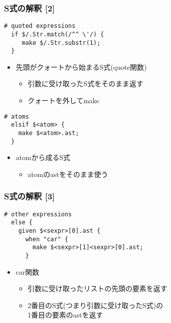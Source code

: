 \documentclass[14pt,dvipdfm,trans]{beamer}
\begin{document}
\begin{frame}[fragile]
 \frametitle{S式の解釈 [2]}
 \begin{lstlisting}[firstnumber=2]
  # quoted expressions
  if $/.Str.match(/^^ \'/) {
     make $/.Str.substr(1);
  } 
 \end{lstlisting}
\begin{itemize}
 \item <2-> 先頭がクォートから始まるS式(quote関数)
       \begin{itemize}
	\item <3-> 引数に受け取ったS式をそのまま返す 
	\item <4-> クォートを外してmake
       \end{itemize}
\end{itemize}
 \pause[5]
 \begin{lstlisting}[firstnumber=6]
   # atoms
  elsif $<atom> {
    make $<atom>.ast;
  }
 \end{lstlisting}
\begin{itemize}
 \item <6-> atomから成るS式
 \begin{itemize}
   \item <7-> atomのastをそのまま使う
 \end{itemize}

\end{itemize}
\end{frame}
 
\begin{frame}[fragile]
 \frametitle{S式の解釈 [3]}
\begin{lstlisting}[firstnumber=10]
  # other expressions
  else {
    given $<sexpr>[0].ast {
      when "car" {
        make $<sexpr>[1]<sexpr>[0].ast;
      }
\end{lstlisting}
\vspace*{1zh}
\begin{itemize}
 \item <3-> car関数

       \begin{itemize}
	\item <4-> 引数に受け取ったリストの先頭の要素を返す
	\item <5-> 2番目のS式(つまり引数に受け取ったS式)の\\
	      1番目の要素のastを返す
       \end{itemize}
\end{itemize}
\end{frame}
\end{document}
